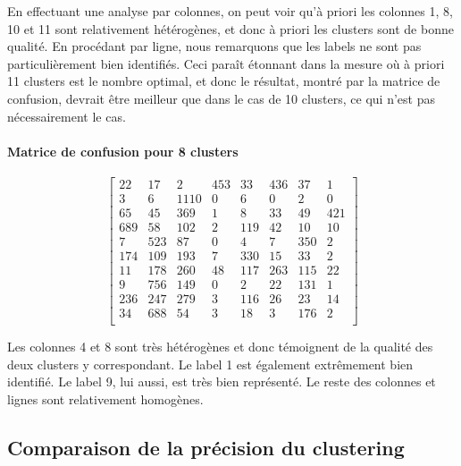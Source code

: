 \documentclass[french,a4paper,18pt]{article}
\begin{document}


En effectuant une analyse par colonnes, on peut voir qu'à priori les colonnes 1, 8, 10 et 11 sont relativement hétérogènes, et donc à priori les clusters sont de bonne qualité.
En procédant par ligne, nous remarquons que les labels ne sont pas particulièrement bien identifiés. Ceci paraît étonnant dans la mesure où à priori 11 clusters est le nombre optimal, et donc le résultat, montré par la matrice de confusion, devrait être meilleur que dans le cas de 10 clusters, ce qui n'est pas nécessairement le cas.


\paragraph{Matrice de confusion pour 8 clusters}

\[
\begin{bmatrix}
22 & 17 & 2 & 453 & 33 & 436 & 37 & 1 \\
3 & 6 & 1110 & 0 & 6 & 0 & 2 & 0 \\
65 & 45 & 369 & 1 & 8 & 33 & 49 & 421 \\
689 & 58 & 102 & 2 & 119 & 42 & 10 & 10 \\
7 & 523 & 87 & 0 & 4 & 7 & 350 & 2 \\
174 & 109 & 193 & 7 & 330 & 15 & 33 & 2 \\
11 & 178 & 260 & 48 & 117 & 263 & 115 & 22 \\
9 & 756 & 149 & 0 & 2 & 22 & 131 & 1 \\
236 & 247 & 279 & 3 & 116 & 26 & 23 & 14 \\
34 & 688 & 54 & 3 & 18 & 3 & 176 & 2 \\
\end{bmatrix}
\]

Les colonnes 4 et 8 sont très hétérogènes et donc témoignent de la qualité des deux clusters y correspondant.
Le label 1 est également extrêmement bien identifié. Le label 9, lui aussi, est très bien représenté.
Le reste des colonnes et lignes sont relativement homogènes.


\subsection{Comparaison de la précision du clustering}
\end{document}
